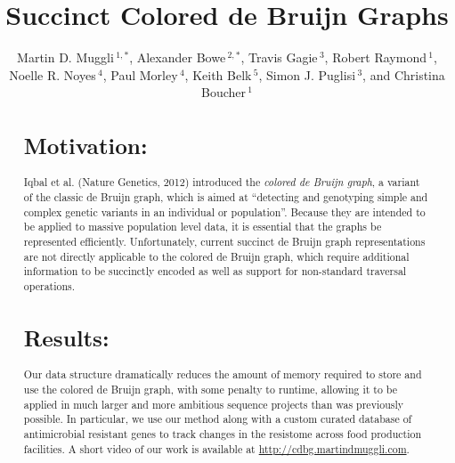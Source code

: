 \documentclass{bioinfo}
\begin{document}

\title[Succinct Colored de Bruijn Graphs]{Succinct Colored de Bruijn Graphs}
\author[Muggli, Bowe \textit{et~al}]{
Martin D. Muggli\,$^{1,*}$, 
Alexander Bowe\,$^{2,*}$, 
Travis Gagie\,$^{3}$,
Robert Raymond\,$^{1}$,
Noelle R. Noyes\,$^{4}$,
Paul Morley\,$^{4}$,
Keith Belk\,$^{5}$,
Simon J. Puglisi\,$^{3}$, and Christina Boucher\,$^1$}
\address{$^{*}$These authors contributed equally to this work. \\
$^{1}$Department of Computer Science,Colorado State University, Fort Collins, CO \\
$^{2}$National Institute of Informatics, Chiyoda-ku, Tokyo, Japan \\
$^{3}$Department of Computer Science,University of Helsinki, Finland \\
$^{4}$Department of Clinical Sciences, Colorado State University, Fort Collins, CO \\
$^{5}$Department of Animal Sciences, Colorado State University, Fort Collins, CO }



\maketitle

\begin{abstract}
\section{Motivation:} Iqbal et al. (Nature Genetics, 2012) introduced the {\em colored de Bruijn graph}, a variant of the classic de Bruijn graph, which is aimed at ``detecting and genotyping simple and complex genetic variants in an individual or population''.
Because they are intended to be applied to massive population level data, it is essential that the graphs be represented efficiently.
Unfortunately, current succinct de Bruijn graph representations are not directly applicable to the colored de Bruijn graph, which require additional information to be succinctly encoded as well as support for non-standard traversal operations. 
\section{Results:} Our data structure dramatically reduces the amount of memory required to store and use the colored de Bruijn graph, with some penalty to runtime, allowing it to be applied in much larger and more ambitious sequence projects than was previously possible.  In particular, we use our method along with a custom curated database of antimicrobial resistant genes to track changes in the resistome across food production facilities. A short video of our work is available at \url{http://cdbg.martindmuggli.com}.

\end{abstract}
\end{document}
